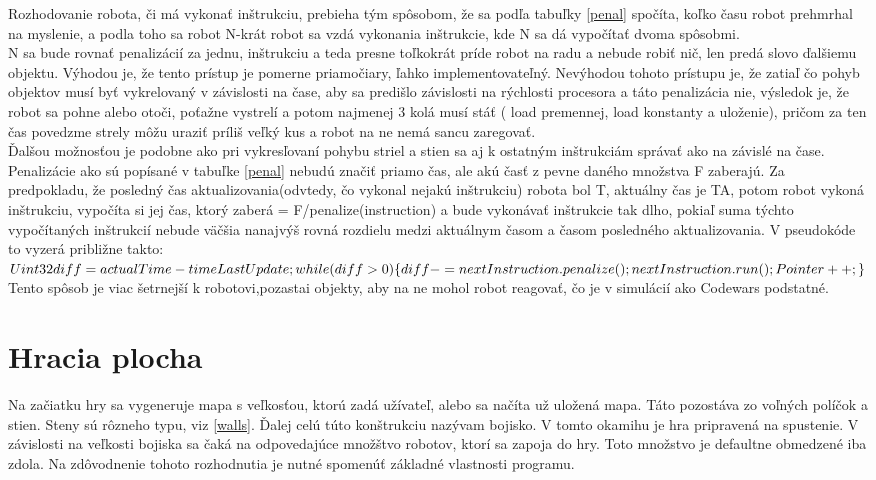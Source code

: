 Rozhodovanie robota, či má vykonať inštrukciu, prebieha tým spôsobom, že sa podľa tabuľky \ref{penal} spočíta, koľko času robot prehmrhal na myslenie, a podla toho sa robot N-krát robot sa vzdá vykonania inštrukcie, kde N sa dá vypočítať dvoma spôsobmi.\\
N sa bude rovnať penalizácií za jednu, inštrukciu a teda presne toľkokrát príde robot na radu a nebude robiť nič, len predá slovo ďalšiemu objektu. Výhodou je, že tento prístup je pomerne priamočiary, ľahko implementovateľný. Nevýhodou tohoto prístupu je, že zatiaľ čo pohyb objektov musí byť vykrelovaný v závislosti na čase, aby sa predišlo závislosti na rýchlosti procesora a táto penalizácia nie, výsledok je, že robot sa pohne alebo otoči, poťažne vystrelí a potom najmenej 3 kolá musí stáť ( load premennej, load konstanty a uloženie), pričom za ten čas povedzme strely môžu uraziť príliš veľký kus a robot na ne nemá sancu zaregovať.\\
Ďalšou možnosťou je podobne ako pri vykresľovaní pohybu striel a stien sa aj k ostatným inštrukciám správať ako na závislé na čase. Penalizácie ako sú popísané v tabuľke \ref{penal} nebudú značiť priamo čas, ale akú časť z pevne daného množstva F zaberajú. Za predpokladu, že posledný čas aktualizovania(odvtedy, čo vykonal nejakú inštrukciu) robota bol T, aktuálny čas je TA, potom robot vykoná inštrukciu, vypočíta si jej čas, ktorý zaberá = F/penalize(instruction) a bude vykonávať inštrukcie tak dlho, pokiaľ suma týchto vypočítaných inštrukcií nebude väčšia nanajvýš rovná rozdielu medzi aktuálnym časom a časom posledného aktualizovania. V pseudokóde to vyzerá približne takto:\\
$ Uint32 diff= actualTime - timeLastUpdate;\\ while (diff > 0)\\\{\\ diff-=nextInstruction.penalize();\\nextInstruction.run();\\Pointer ++; \\\}\\ $ Tento spôsob je viac šetrnejší k robotovi,pozastai objekty, aby na ne mohol robot reagovať, čo je v simulácií ako Codewars podstatné.	

\section{Hracia plocha} %
Na začiatku hry sa vygeneruje mapa s veľkosťou, ktorú zadá užívateľ, alebo sa načíta už uložená mapa. Táto pozostáva zo voľných políčok a stien. Steny sú rôzneho typu, viz \ref{walls}. Ďalej celú túto konštrukciu nazývam bojisko. V tomto okamihu je hra pripravená na spustenie. V závislosti na veľkosti bojiska sa čaká na odpovedajúce množštvo robotov, ktorí sa zapoja do hry. Toto množstvo je defaultne obmedzené iba zdola. Na zdôvodnenie tohoto rozhodnutia je nutné spomenúť základné vlastnosti programu. 
